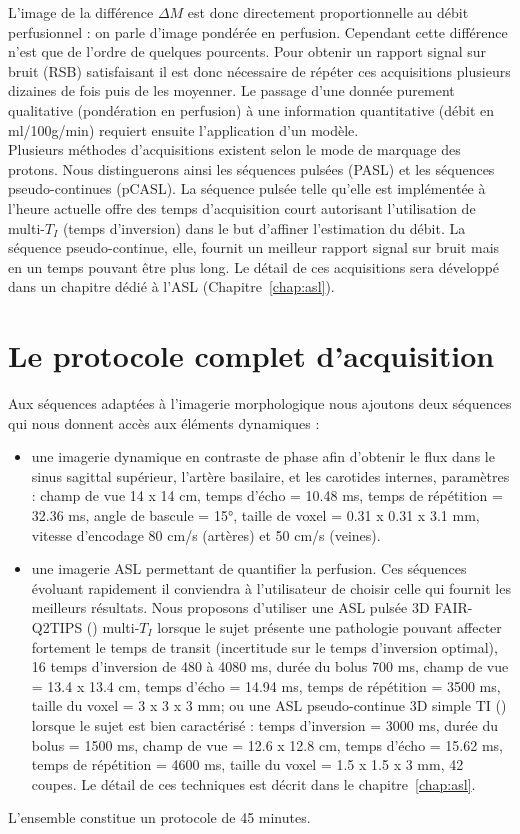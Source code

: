 L’image de la différence $\Delta M$ est donc directement proportionnelle au débit perfusionnel : on
parle d’image pondérée en perfusion. Cependant cette différence n’est que de l’ordre de quelques
pourcents. Pour obtenir un rapport signal sur bruit (RSB) satisfaisant il est donc nécessaire de répéter
ces acquisitions plusieurs dizaines de fois puis de les moyenner. Le passage d’une donnée purement
qualitative (pondération en perfusion) à une information quantitative (débit en ml/100g/min) requiert
ensuite l’application d’un modèle.\\
Plusieurs méthodes d’acquisitions existent selon le mode de marquage des protons. Nous
distinguerons ainsi les séquences pulsées (PASL) et les séquences pseudo-continues (pCASL). La
séquence pulsée telle qu’elle est implémentée à l’heure actuelle offre des temps d’acquisition court
autorisant l’utilisation de multi-$T_I$ (temps d’inversion) dans le but d’affiner l’estimation du débit. La
séquence pseudo-continue, elle, fournit un meilleur rapport signal sur bruit mais en un temps pouvant
être plus long. Le détail de ces acquisitions sera développé dans un chapitre dédié à l’ASL (Chapitre~\ref{chap:asl}).
\section{Le protocole complet d'acquisition}
\label{sec:protocole}
Aux séquences adaptées à l’imagerie morphologique nous ajoutons deux séquences qui nous
donnent accès aux éléments dynamiques :
\begin{itemize}
\item une imagerie dynamique en contraste de phase afin d’obtenir le flux dans le sinus sagittal
supérieur, l’artère basilaire, et les carotides internes, paramètres : champ de vue 14 x 14
cm, temps d’écho = 10.48 ms, temps de répétition = 32.36 ms, angle de bascule = 15°,
taille de voxel = 0.31 x 0.31 x 3.1 mm, vitesse d’encodage 80 cm/s (artères) et 50 cm/s
(veines).
\item une imagerie ASL permettant de quantifier la perfusion. Ces séquences évoluant
rapidement il conviendra à l’utilisateur de choisir celle qui fournit les meilleurs résultats.
Nous proposons d’utiliser une ASL pulsée 3D FAIR-Q2TIPS (\cite{Gunther2005}) multi-$T_I$ lorsque le sujet
présente une pathologie pouvant affecter fortement le temps de transit (incertitude sur le
temps d’inversion optimal), 16 temps d’inversion de 480 à 4080 ms, durée du bolus 700
ms, champ de vue = 13.4 x 13.4 cm, temps d’écho = 14.94 ms, temps de répétition = 3500
ms, taille du voxel = 3 x 3 x 3 mm; ou une ASL pseudo-continue 3D simple TI (\cite{Wu2007}) lorsque
le sujet est bien caractérisé : temps d’inversion = 3000 ms, durée du bolus = 1500 ms,
champ de vue = 12.6 x 12.8 cm, temps d’écho = 15.62 ms, temps de répétition = 4600 ms,
taille du voxel = 1.5 x 1.5 x 3 mm, 42 coupes. Le détail de ces techniques est décrit dans le
chapitre~\ref{chap:asl}.
\end{itemize}
L’ensemble constitue un protocole de 45 minutes.




	
{}
